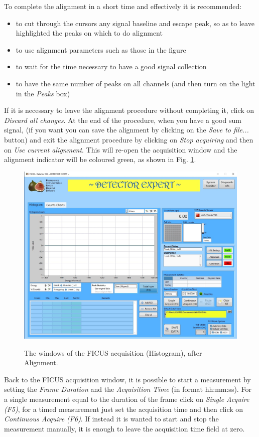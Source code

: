 \documentclass[a4paper,12pt,oneside,pdflatex,italian,final,twocolumn]{article}
\begin{document}
To complete the alignment in a short time and effectively it is recommended:
\begin{itemize}
\item to cut through the cursors any signal baseline and escape peak, so as to leave highlighted the peaks on which to do alignment
\item to use alignment parameters such as those in the figure  
\item to wait for the time necessary to have a good signal collection
\item to have the same number of peaks on all channels (and then turn on the light in the \textit{Peaks} box)
\end{itemize}
If it is necessary to leave the alignment procedure without completing it, click on \textit{Discard all changes}.
At the end of the procedure, when you have a good sum signal, (if you want you can save the alignment by clicking on the \textit{Save to file...} button) and  exit the alignment procedure by clicking on \textit{Stop acquiring} and then on \textit{Use current alignment}. This will re-open the acquisition window and the alignment indicator will be coloured green, as shown in Fig. \ref{fig:fig23}.

\begin{figure}[h]
\centering
{\includegraphics[width=.95\textwidth]{Capture32.jpg}} \quad
\caption{The windows of the FICUS acquisition (Histogram), after Alignment.}\label{fig:fig23}
\end{figure}

Back to the FICUS acquisition window, it is possible to start a measurement by setting the \textit{Frame Duration} and the \textit{Acquisition Time} (in format hh:mm:ss). For a single measurement equal to the duration of the frame click on \textit{Single Acquire (F5)}, for a timed measurement just set the acquisition time and then click on \textit{Continuous Acquire (F6)}. If instead it is wanted to start and stop the measurement manually, it is enough to leave the acquisition time field at zero.
\end{document}
